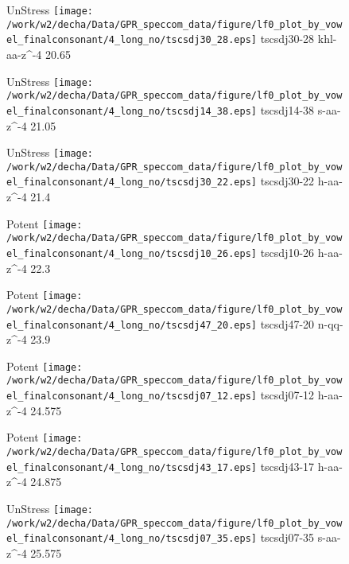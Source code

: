 \documentclass{article}
\begin{document}
\begin{figure}[t]
\begin{minipage}[b]{.24\textwidth}
UnStress
\centering
\texttt{[image: /work/w2/decha/Data/GPR\_speccom\_data/figure/lf0\_plot\_by\_vowel\_finalconsonant/4\_long\_no/tscsdj30\_28.eps]}
tscsdj30-28 khl-aa-z\textasciicircum-4 20.65
\end{minipage}
\begin{minipage}[b]{.24\textwidth}
UnStress
\centering
\texttt{[image: /work/w2/decha/Data/GPR\_speccom\_data/figure/lf0\_plot\_by\_vowel\_finalconsonant/4\_long\_no/tscsdj14\_38.eps]}
tscsdj14-38 s-aa-z\textasciicircum-4 21.05
\end{minipage}
\begin{minipage}[b]{.24\textwidth}
UnStress
\centering
\texttt{[image: /work/w2/decha/Data/GPR\_speccom\_data/figure/lf0\_plot\_by\_vowel\_finalconsonant/4\_long\_no/tscsdj30\_22.eps]}
tscsdj30-22 h-aa-z\textasciicircum-4 21.4
\end{minipage}
\begin{minipage}[b]{.24\textwidth}
\colorbox{Apricot}{Potent}
\centering
\texttt{[image: /work/w2/decha/Data/GPR\_speccom\_data/figure/lf0\_plot\_by\_vowel\_finalconsonant/4\_long\_no/tscsdj10\_26.eps]}
tscsdj10-26 h-aa-z\textasciicircum-4 22.3
\end{minipage}
\end{figure}
\clearpage
\begin{figure}[t]
\begin{minipage}[b]{.24\textwidth}
\colorbox{Apricot}{Potent}
\centering
\texttt{[image: /work/w2/decha/Data/GPR\_speccom\_data/figure/lf0\_plot\_by\_vowel\_finalconsonant/4\_long\_no/tscsdj47\_20.eps]}
tscsdj47-20 n-qq-z\textasciicircum-4 23.9
\end{minipage}
\begin{minipage}[b]{.24\textwidth}
\colorbox{Apricot}{Potent}
\centering
\texttt{[image: /work/w2/decha/Data/GPR\_speccom\_data/figure/lf0\_plot\_by\_vowel\_finalconsonant/4\_long\_no/tscsdj07\_12.eps]}
tscsdj07-12 h-aa-z\textasciicircum-4 24.575
\end{minipage}
\begin{minipage}[b]{.24\textwidth}
\colorbox{Apricot}{Potent}
\centering
\texttt{[image: /work/w2/decha/Data/GPR\_speccom\_data/figure/lf0\_plot\_by\_vowel\_finalconsonant/4\_long\_no/tscsdj43\_17.eps]}
tscsdj43-17 h-aa-z\textasciicircum-4 24.875
\end{minipage}
\begin{minipage}[b]{.24\textwidth}
UnStress
\centering
\texttt{[image: /work/w2/decha/Data/GPR\_speccom\_data/figure/lf0\_plot\_by\_vowel\_finalconsonant/4\_long\_no/tscsdj07\_35.eps]}
tscsdj07-35 s-aa-z\textasciicircum-4 25.575
\end{minipage}
\end{figure}
\end{document}
